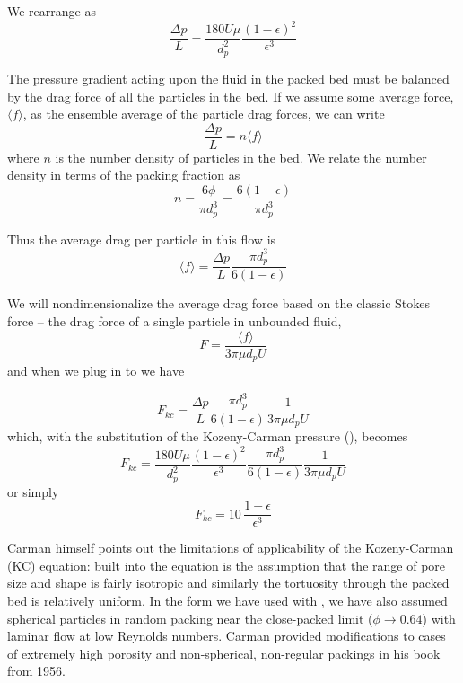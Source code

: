We rearrange  as
\begin{equation}\label{eq:K-C-pressure}
    \frac{\Delta p}{L} = \frac{180 \bar{U} \mu}{d_p^2} \frac{(1-\epsilon)^2}{\epsilon^3}
\end{equation}

The pressure gradient acting upon the fluid in the packed bed must be balanced by the drag force of all the particles in the bed. If we assume some average force, $\langle f \rangle$, as the ensemble average of the particle drag forces, we can write
\begin{equation}
    \frac{\Delta p}{L} = n \langle f \rangle
\end{equation}
where $n$ is the number density of particles in the bed. We relate the number density in terms of the packing fraction as
\begin{equation}
    n = \frac{6\phi}{\pi d_p^3} = \frac{6(1-\epsilon)}{\pi d_p^3}
\end{equation}

Thus the average drag per particle in this flow is
\begin{equation}\label{eq:average-drag}
    \langle f \rangle = \frac{\Delta p}{L}\frac{\pi d_p^3}{6(1-\epsilon)}
\end{equation}

We will nondimensionalize the average drag force based on the classic Stokes force -- the drag force of a single particle in unbounded fluid,
\begin{equation}\label{eq:non-dim-drag}
    F = \frac{\langle f \rangle}{3\pi \mu d_p U}
\end{equation}
and when we plug in  to  we have

\begin{equation}
    F_{kc} = \frac{\Delta p}{L}\frac{\pi d_p^3}{6(1-\epsilon)}\frac{1}{3\pi \mu d_p U}
\end{equation}
which, with the substitution of the Kozeny-Carman pressure (), becomes
\begin{equation}
    F_{kc} = \frac{180 U \mu}{d_p^2} \frac{(1-\epsilon)^2}{\epsilon^3}\frac{\pi d_p^3}{6(1-\epsilon)}\frac{1}{3\pi \mu d_p U}
\end{equation}
or simply
\begin{equation}\label{eq:K-C-non-dim}
    F_{kc} = 10\, \frac{1-\epsilon}{\epsilon^3}
\end{equation}

Carman himself\cite{Carman1956} points out the limitations of applicability of the Kozeny-Carman (KC) equation: built into the equation is the assumption that the range of pore size and shape is fairly isotropic and similarly the tortuosity through the packed bed is relatively uniform. In the form we have used with , we have also assumed spherical particles in random packing near the close-packed limit ($\phi \rightarrow 0.64$) with laminar flow at low Reynolds numbers. Carman provided modifications to cases of extremely high porosity and non-spherical, non-regular packings in his book from 1956.\cite{Carman1956}

